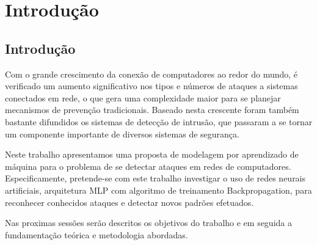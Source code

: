 \part{Introdução}
\chapter[Introdução]{Introdução}

Com o grande crescimento da conexão de computadores ao redor do mundo, é verificado um aumento significativo nos tipos e números de ataques a sistemas conectados em rede, o que gera uma complexidade maior para se planejar mecanismos de prevenção tradicionais. Baseado nesta crescente foram também bastante difundidos os sistemas de detecção de intrusão, que passaram a se tornar um componente importante de diversos sistemas de segurança.

Neste trabalho apresentamos uma proposta de modelagem por aprendizado de máquina para o problema de se detectar ataques em redes de computadores. Especificamente, pretende-se com este trabalho investigar o uso de redes neurais artificiais,  arquitetura MLP com algoritmo de treinamento Backpropagation, para reconhecer conhecidos ataques e detectar novos padrões efetuados.

Nas proximas sessões serão descritos os objetivos do trabalho e em seguida a fundamentação teórica e metodologia abordadas.